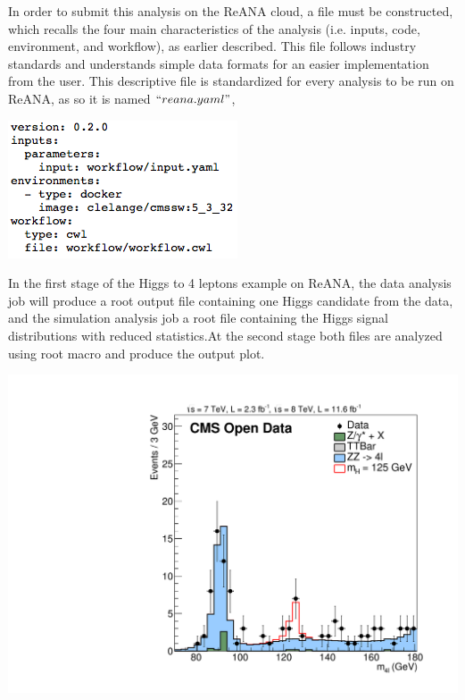 \documentclass[letter]{article}
\newcommand\tab[1][1cm]{\hspace*{#1}}
\begin{document}
\tab In order to submit this analysis on the ReANA cloud, a file must be constructed, which recalls the four main characteristics of the analysis (i.e. inputs, code, environment, and workflow), as earlier described. This file follows industry standards and understands simple data formats for an easier implementation from the user. This descriptive file is standardized for every analysis to be run on ReANA, as so it is named $``reana.yaml"$,
\begin{center}
\includegraphics[scale=0.5]{reana}
\end{center}
In the first stage of the Higgs to 4 leptons example on ReANA, the data analysis job will produce a root output file containing one Higgs candidate from the data, and the simulation analysis job a root file containing the Higgs signal distributions with reduced statistics.At the second stage both files are analyzed using root macro and produce the output plot.
\begin{center}
\hspace{-80pt}
\includegraphics[scale=0.075]{plot}
\vspace{-10pt}
\end{center}
\end{document}
